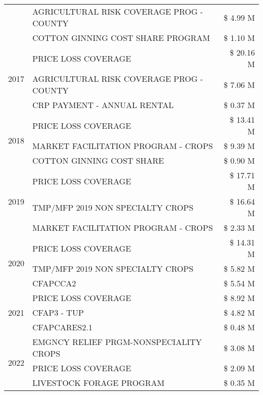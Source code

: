 \begin{tabular}{llr}
 & AGRICULTURAL RISK COVERAGE PROG - COUNTY & \$ 4.99 M \\
 & COTTON GINNING COST SHARE PROGRAM & \$ 1.10 M \\
\cline{1-3}
\multirow[t]{3}{*}{2017} & PRICE LOSS COVERAGE & \$ 20.16 M \\
 & AGRICULTURAL RISK COVERAGE PROG - COUNTY & \$ 7.06 M \\
 & CRP PAYMENT - ANNUAL RENTAL & \$ 0.37 M \\
\cline{1-3}
\multirow[t]{3}{*}{2018} & PRICE LOSS COVERAGE & \$ 13.41 M \\
 & MARKET FACILITATION PROGRAM - CROPS & \$ 9.39 M \\
 & COTTON GINNING COST SHARE & \$ 0.90 M \\
\cline{1-3}
\multirow[t]{3}{*}{2019} & PRICE LOSS COVERAGE & \$ 17.71 M \\
 & TMP/MFP 2019 NON SPECIALTY CROPS & \$ 16.64 M \\
 & MARKET FACILITATION PROGRAM - CROPS & \$ 2.33 M \\
\cline{1-3}
\multirow[t]{3}{*}{2020} & PRICE LOSS COVERAGE & \$ 14.31 M \\
 & TMP/MFP 2019 NON SPECIALTY CROPS & \$ 5.82 M \\
 & CFAPCCA2 & \$ 5.54 M \\
\cline{1-3}
\multirow[t]{3}{*}{2021} & PRICE LOSS COVERAGE & \$ 8.92 M \\
 & CFAP3 - TUP & \$ 4.82 M \\
 & CFAPCARES2.1 & \$ 0.48 M \\
\cline{1-3}
\multirow[t]{3}{*}{2022} & EMGNCY RELIEF PRGM-NONSPECIALITY CROPS & \$ 3.08 M \\
 & PRICE LOSS COVERAGE & \$ 2.09 M \\
 & LIVESTOCK FORAGE PROGRAM & \$ 0.35 M \\
\cline{1-3}
\bottomrule
\end{tabular}
